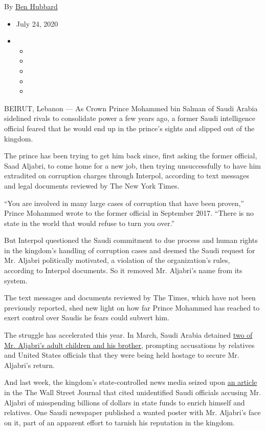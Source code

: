 By \href{https://www.nytimes.com/by/ben-hubbard}{Ben Hubbard}

\begin{itemize}
\item
  July 24, 2020
\item
  \begin{itemize}
  \item
  \item
  \item
  \item
  \item
  \end{itemize}
\end{itemize}

BEIRUT, Lebanon --- As Crown Prince Mohammed bin Salman of Saudi Arabia
sidelined rivals to consolidate power a few years ago, a former Saudi
intelligence official feared that he would end up in the prince's sights
and slipped out of the kingdom.

The prince has been trying to get him back since, first asking the
former official, Saad Aljabri, to come home for a new job, then trying
unsuccessfully to have him extradited on corruption charges through
Interpol, according to text messages and legal documents reviewed by The
New York Times.

``You are involved in many large cases of corruption that have been
proven,'' Prince Mohammed wrote to the former official in September
2017. ``There is no state in the world that would refuse to turn you
over.''

But Interpol questioned the Saudi commitment to due process and human
rights in the kingdom's handling of corruption cases and deemed the
Saudi request for Mr. Aljabri politically motivated, a violation of the
organization's rules, according to Interpol documents. So it removed Mr.
Aljabri's name from its system.

The text messages and documents reviewed by The Times, which have not
been previously reported, shed new light on how far Prince Mohammed has
reached to exert control over Saudis he fears could subvert him.

The struggle has accelerated this year. In March, Saudi Arabia detained
\href{https://www.nytimes.com/2020/05/21/world/middleeast/saudi-aljabri-detain.html}{two
of Mr. Aljabri's adult children and his brother}, prompting accusations
by relatives and United States officials that they were being held
hostage to secure Mr. Aljabri's return.

And last week, the kingdom's state-controlled news media seized upon
\href{https://www.wsj.com/articles/a-spymaster-ran-off-after-saudis-say-billions-went-missing-they-want-him-back-11595004443}{an
article} in the The Wall Street Journal that cited unidentified Saudi
officials accusing Mr. Aljabri of misspending billions of dollars in
state funds to enrich himself and relatives. One Saudi newspaper
published a wanted poster with Mr. Aljabri's face on it, part of an
apparent effort to tarnish his reputation in the kingdom.


